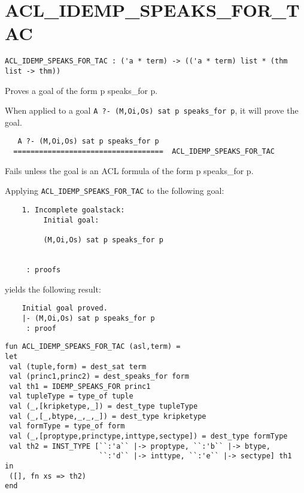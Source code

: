 \SEEALSO
\ENDDOC

\section{ACL\_IDEMP\_SPEAKS\_FOR\_TAC}



\small
\begin{lstlisting}[breaklines]
ACL_IDEMP_SPEAKS_FOR_TAC : ('a * term) -> (('a * term) list * (thm list -> thm))
\end{lstlisting}\egroup


\SYNOPSIS
Proves a goal of the form p speaks_for p.

\DESCRIBE When applied to a goal \texttt{A ?- (M,Oi,Os) sat p speaks\_for p}, it will prove the goal.
\begin{verbatim}
   A ?- (M,Oi,Os) sat p speaks_for p
  ===================================  ACL_IDEMP_SPEAKS_FOR_TAC

\end{verbatim}

\FAILURE 
Fails unless the goal is an ACL formula of the form p speaks_for p.

\EXAMPLE
Applying \texttt{ACL\_IDEMP\_SPEAKS\_FOR\_TAC} to the following goal:
\begin{holboxed}
\begin{verbatim}
    1. Incomplete goalstack:
         Initial goal:
    
         (M,Oi,Os) sat p speaks_for p
    
    
     : proofs
\end{verbatim}
\end{holboxed}
yields the following result:
\begin{holboxed}
\begin{verbatim}
    Initial goal proved.
    |- (M,Oi,Os) sat p speaks_for p
     : proof
\end{verbatim}
\end{holboxed}

\IMPLEMENTATION
\begin{holboxed}
\begin{verbatim}
fun ACL_IDEMP_SPEAKS_FOR_TAC (asl,term) = 
let
 val (tuple,form) = dest_sat term
 val (princ1,princ2) = dest_speaks_for form
 val th1 = IDEMP_SPEAKS_FOR princ1
 val tupleType = type_of tuple
 val (_,[kripketype,_]) = dest_type tupleType
 val (_,[_,btype,_,_,_]) = dest_type kripketype
 val formType = type_of form
 val (_,[proptype,princtype,inttype,sectype]) = dest_type formType
 val th2 = INST_TYPE [``:'a`` |-> proptype, ``:'b`` |-> btype, 
                      ``:'d`` |-> inttype, ``:'e`` |-> sectype] th1
in
 ([], fn xs => th2)
end
\end{verbatim}
\end{holboxed}

